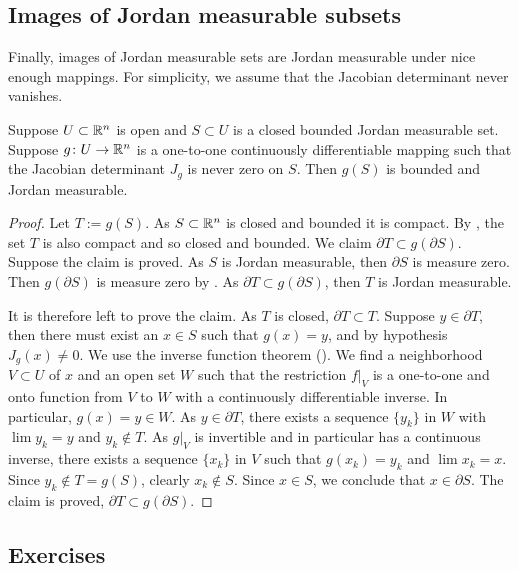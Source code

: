 \subsection{Images of Jordan measurable subsets}

Finally, images of Jordan measurable sets are Jordan measurable under
nice enough mappings.  For simplicity, we assume that the Jacobian
determinant never vanishes.

\begin{prop} \label{prop:imagejordanmeas}
Suppose $U \subset {\mathbb{R}}^n$ is open and
$S \subset U$ is a closed bounded Jordan measurable set.
Suppose
$g \colon U \to {\mathbb{R}}^n$ is a one-to-one
continuously differentiable mapping such that
the Jacobian determinant $J_g$ is never zero on $S$.
Then $g(S)$ is bounded and Jordan measurable.
\end{prop}

\begin{proof}
Let $T := g(S)$.  As $S \subset {\mathbb{R}}^n$ is closed and bounded it is compact.
By 
,
the set
$T$ is also compact and so closed and bounded.
We claim $\partial T \subset g(\partial S)$.  Suppose the claim is proved.
As $S$ is Jordan measurable, then
$\partial S$ is measure zero.  Then  $g(\partial S)$ is measure
zero by .  As $\partial T \subset g(\partial
S)$, then $T$ is Jordan measurable.

It is therefore left to prove the claim.
As $T$ is closed, $\partial T \subset T$.
Suppose $y \in \partial T$, then there must exist an
$x \in S$
such that $g(x) = y$, and by hypothesis $J_g(x) \not= 0$.
We use the inverse function theorem ().  We find 
a neighborhood $V \subset U$ of $x$ and an open set $W$ such that
the restriction $f|_V$ is a one-to-one and onto function from $V$ to $W$
with a continuously differentiable inverse.  In particular, $g(x) = y \in W$.
As $y \in \partial T$, there exists a sequence $\{ y_k \}$ in $W$ with
$\lim y_k = y$ and $y_k \notin T$.  As $g|_V$ is invertible and in
particular has a continuous inverse, there exists
a sequence $\{ x_k \}$ in $V$ such that $g(x_k) = y_k$ and $\lim x_k = x$.
Since $y_k \notin T = g(S)$, clearly $x_k \notin S$.  Since $x \in S$, we
conclude that $x \in \partial S$.  The claim is proved, $\partial T \subset
g(\partial S)$.
\end{proof}

\subsection{Exercises}

